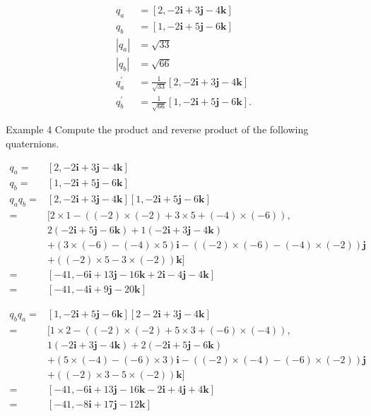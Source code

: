 $$
\begin{aligned}
q_{a} & =[2,-2 \mathbf{i}+3 \mathbf{j}-4 \mathbf{k}] \\
q_{b} & =[1,-2 \mathbf{i}+5 \mathbf{j}-6 \mathbf{k}] \\
\left|q_{a}\right| & =\sqrt{33} \\
\left|q_{b}\right| & =\sqrt{66} \\
q_{a}^{\prime} & =\frac{1}{\sqrt{33}}[2,-2 \mathbf{i}+3 \mathbf{j}-4 \mathbf{k}] \\
q_{b}^{\prime} & =\frac{1}{\sqrt{66}}[1,-2 \mathbf{i}+5 \mathbf{j}-6 \mathbf{k}] .
\end{aligned}
$$

Example 4 Compute the product and reverse product of the following quaternions.

$$
\begin{aligned}
q_{a}= & {[2,-2 \mathbf{i}+3 \mathbf{j}-4 \mathbf{k}] } \\
q_{b}= & {[1,-2 \mathbf{i}+5 \mathbf{j}-6 \mathbf{k}] } \\
q_{a} q_{b}= & {[2,-2 \mathbf{i}+3 \mathbf{j}-4 \mathbf{k}][1,-2 \mathbf{i}+5 \mathbf{j}-6 \mathbf{k}] } \\
= & {[2 \times 1-((-2) \times(-2)+3 \times 5+(-4) \times(-6)),} \\
& 2(-2 \mathbf{i}+5 \mathbf{j}-6 \mathbf{k})+1(-2 \mathbf{i}+3 \mathbf{j}-4 \mathbf{k}) \\
& +(3 \times(-6)-(-4) \times 5) \mathbf{i}-((-2) \times(-6)-(-4) \times(-2)) \mathbf{j} \\
& +((-2) \times 5-3 \times(-2)) \mathbf{k}] \\
= & {[-41,-6 \mathbf{i}+13 \mathbf{j}-16 \mathbf{k}+2 \mathbf{i}-4 \mathbf{j}-4 \mathbf{k}] } \\
= & {[-41,-4 \mathbf{i}+9 \mathbf{j}-20 \mathbf{k}] }
\end{aligned}
$$

$$
\begin{aligned}
q_{b} q_{a}= & {[1,-2 \mathbf{i}+5 \mathbf{j}-6 \mathbf{k}][2-2 \mathbf{i}+3 \mathbf{j}-4 \mathbf{k}] } \\
= & {[1 \times 2-((-2) \times(-2)+5 \times 3+(-6) \times(-4)),} \\
& 1(-2 \mathbf{i}+3 \mathbf{j}-4 \mathbf{k})+2(-2 \mathbf{i}+5 \mathbf{j}-6 \mathbf{k}) \\
& +(5 \times(-4)-(-6) \times 3) \mathbf{i}-((-2) \times(-4)-(-6) \times(-2)) \mathbf{j} \\
& +((-2) \times 3-5 \times(-2)) \mathbf{k}] \\
= & {[-41,-6 \mathbf{i}+13 \mathbf{j}-16 \mathbf{k}-2 \mathbf{i}+4 \mathbf{j}+4 \mathbf{k}] } \\
= & {[-41,-8 \mathbf{i}+17 \mathbf{j}-12 \mathbf{k}] }
\end{aligned}
$$

